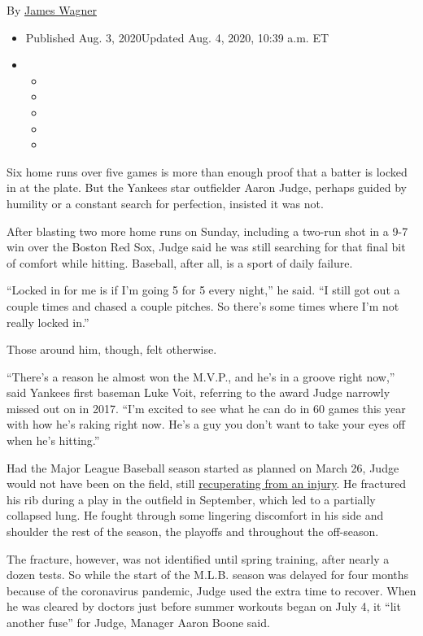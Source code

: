 By \href{https://www.nytimes3xbfgragh.onion/by/james-wagner}{James
Wagner}

\begin{itemize}
\item
  Published Aug. 3, 2020Updated Aug. 4, 2020, 10:39 a.m. ET
\item
  \begin{itemize}
  \item
  \item
  \item
  \item
  \item
  \end{itemize}
\end{itemize}

Six home runs over five games is more than enough proof that a batter is
locked in at the plate. But the Yankees star outfielder Aaron Judge,
perhaps guided by humility or a constant search for perfection, insisted
it was not.

After blasting two more home runs on Sunday, including a two-run shot in
a 9-7 win over the Boston Red Sox, Judge said he was still searching for
that final bit of comfort while hitting. Baseball, after all, is a sport
of daily failure.

``Locked in for me is if I'm going 5 for 5 every night,'' he said. ``I
still got out a couple times and chased a couple pitches. So there's
some times where I'm not really locked in.''

Those around him, though, felt otherwise.

``There's a reason he almost won the M.V.P., and he's in a groove right
now,'' said Yankees first baseman Luke Voit, referring to the award
Judge narrowly missed out on in 2017. ``I'm excited to see what he can
do in 60 games this year with how he's raking right now. He's a guy you
don't want to take your eyes off when he's hitting.''

Had the Major League Baseball season started as planned on March 26,
Judge would not have been on the field, still
\href{https://www.nytimes3xbfgragh.onion/2020/03/06/sports/baseball/aaron-judge-yankees.html}{recuperating
from an injury}. He fractured his rib during a play in the outfield in
September, which led to a partially collapsed lung. He fought through
some lingering discomfort in his side and shoulder the rest of the
season, the playoffs and throughout the off-season.

The fracture, however, was not identified until spring training, after
nearly a dozen tests. So while the start of the M.L.B. season was
delayed for four months because of the coronavirus pandemic, Judge used
the extra time to recover. When he was cleared by doctors just before
summer workouts began on July 4, it ``lit another fuse'' for Judge,
Manager Aaron Boone said.

